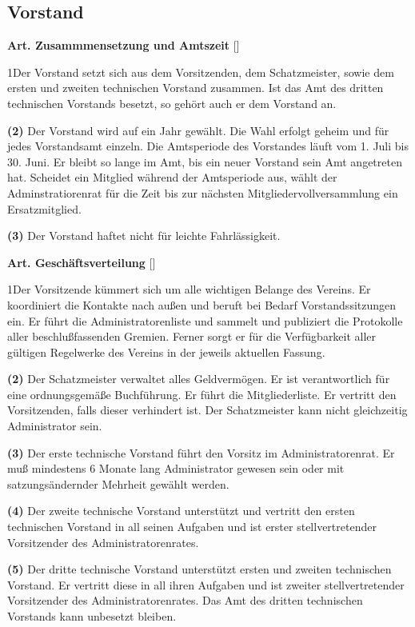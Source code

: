 \documentclass[12pt]{article}
\newcommand{\UAbschnitt}[1]{\subsection{#1}}
\newcommand{\Satz}[2]{

\begin{samepage}
{\bf (#1)} #2
\end{samepage}
}
\newenvironment{Artikel}[2]{
\bigskip \centerline{{\bf Art. #1} [#2]}
\nopagebreak
}{
}
\begin{document}
\UAbschnitt{Vorstand}

\begin{Artikel}{22}{Zusammmensetzung und Amtszeit}

\Satz{1}{Der Vorstand setzt sich aus dem Vorsitzenden, dem Schatzmeister, sowie
dem ersten und zweiten technischen Vorstand zusammen. Ist das Amt des dritten
technischen Vorstands besetzt, so gehört auch er dem Vorstand an.}

\Satz{2}{Der Vorstand wird auf ein Jahr gewählt. Die Wahl erfolgt geheim und
für jedes Vorstandsamt einzeln. Die Amtsperiode des Vorstandes
läuft vom 1. Juli bis 30. Juni. Er bleibt so lange im Amt, bis ein neuer
Vorstand sein Amt angetreten hat. Scheidet ein Mitglied während der Amtsperiode
aus, wählt der Adminstratiorenrat für die Zeit bis zur nächsten
Mitgliedervollversammlung ein Ersatzmitglied.}

\Satz{3}{Der Vorstand haftet nicht für leichte Fahrlässigkeit.}

\end{Artikel}

\begin{Artikel}{23}{Geschäftsverteilung}

\Satz{1}{Der Vorsitzende kümmert sich um alle wichtigen Belange des Vereins. Er
koordiniert die Kontakte nach außen und beruft bei Bedarf Vorstandssitzungen
ein. Er führt die Administratorenliste und sammelt und publiziert die
Protokolle aller beschlußfassenden Gremien. Ferner sorgt er für die
Verfügbarkeit aller gültigen Regelwerke des Vereins in der jeweils aktuellen
Fassung.}

\Satz{2}{Der Schatzmeister verwaltet alles Geldvermögen. Er ist verantwortlich
für eine ordnungsgemäße Buchführung. Er führt die Mitgliederliste. Er vertritt
den Vorsitzenden, falls dieser verhindert ist. Der Schatzmeister kann nicht
gleichzeitig Administrator sein.}

\Satz{3}{Der erste technische Vorstand führt den Vorsitz im Administratorenrat.
Er muß mindestens 6 Monate lang Administrator gewesen sein oder mit
satzungsändernder Mehrheit gewählt werden.}

\Satz{4}{Der zweite technische Vorstand unterstützt und vertritt den ersten
technischen Vorstand in all seinen Aufgaben und ist erster stellvertretender
Vorsitzender des Administratorenrates.}

\Satz{5}{Der dritte technische Vorstand unterstützt ersten und zweiten
technischen Vorstand. Er vertritt diese in all ihren Aufgaben und ist zweiter
stellvertretender Vorsitzender des Administratorenrates.
Das Amt des dritten technischen Vorstands kann unbesetzt bleiben.}

\end{Artikel}
\end{document}
